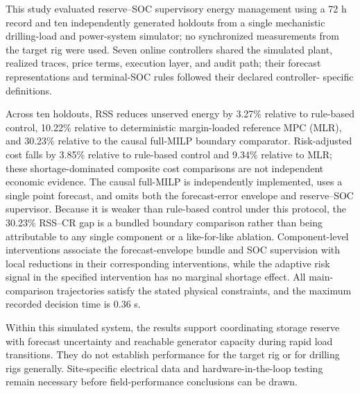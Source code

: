 This study evaluated reserve--SOC supervisory energy management using a 72 h
record and ten independently generated holdouts from a single mechanistic
drilling-load and power-system simulator; no synchronized measurements from
the target rig were used. Seven online controllers shared the simulated plant,
realized traces, price terms, execution layer, and audit path; their forecast
representations and terminal-SOC rules followed their declared controller-
specific definitions.

Across ten holdouts, RSS reduces unserved energy by 3.27\% relative to
rule-based control, 10.22\% relative to deterministic margin-loaded reference
MPC (MLR), and 30.23\% relative to the causal full-MILP boundary comparator.
Risk-adjusted cost falls by 3.85\% relative to rule-based control and 9.34\%
relative to MLR; these shortage-dominated composite cost comparisons are not
independent economic evidence. The causal full-MILP is independently
implemented, uses a single point forecast, and
omits both the forecast-error envelope and reserve--SOC supervisor. Because it
is weaker than rule-based control under this protocol, the 30.23\% RSS--CR gap
is a bundled boundary comparison rather than being attributable to any single
component or a like-for-like ablation. Component-level interventions associate
the forecast-envelope bundle and SOC supervision with local reductions in their
corresponding interventions, while the adaptive risk signal in the specified
intervention has no marginal shortage effect. All main-comparison trajectories
satisfy the stated physical
constraints, and the maximum recorded decision time is 0.36 s.

Within this simulated system, the results support coordinating storage reserve
with forecast uncertainty and reachable generator capacity during rapid load
transitions. They do not establish performance for the target rig or for
drilling rigs generally. Site-specific electrical data and hardware-in-the-loop
testing remain necessary before field-performance conclusions can be drawn.
